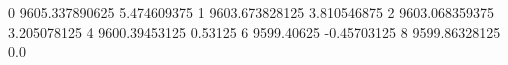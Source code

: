 0 9605.337890625 5.474609375
1 9603.673828125 3.810546875
2 9603.068359375 3.205078125
4 9600.39453125 0.53125
6 9599.40625 -0.45703125
8 9599.86328125 0.0
